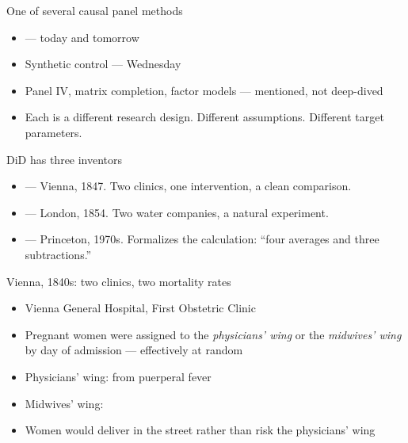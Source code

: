 \documentclass[aspectratio=169,11pt]{beamer}
\begin{document}
\begin{frame}{One of several causal panel methods}
\vspace{0.5em}
\begin{itemize}
  \item {} --- today and tomorrow
  \item Synthetic control --- Wednesday
  \item Panel IV, matrix completion, factor models --- mentioned, not deep-dived
  \item Each is a different research design. Different assumptions. Different target parameters.
\end{itemize}
\end{frame}

\begin{frame}{DiD has three inventors}
\vspace{0.4em}
\begin{itemize}
  \item {} --- Vienna, 1847. Two clinics, one intervention, a clean comparison.
  \item {} --- London, 1854. Two water companies, a natural experiment.
  \item {} --- Princeton, 1970s. Formalizes the calculation: ``four averages and three subtractions.''
\end{itemize}
\vspace{0.6em}
\end{frame}


\begin{frame}{Vienna, 1840s: two clinics, two mortality rates}
\vspace{0.4em}
\begin{itemize}
  \item Vienna General Hospital, First Obstetric Clinic
  \item Pregnant women were assigned to the \textit{physicians' wing} or the \textit{midwives' wing} by day of admission --- effectively at random
  \item Physicians' wing:  from puerperal fever
  \item Midwives' wing: 
  \item Women would deliver in the street rather than risk the physicians' wing
\end{itemize}
\end{frame}
\end{document}
